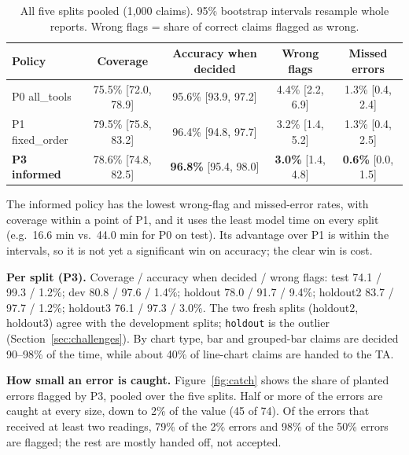 \documentclass[11pt,a4paper]{article}
\newcommand{\code}[1]{\texttt{\small #1}}
\begin{document}
\begin{table}[H]
\centering\small
\caption{All five splits pooled (1{,}000 claims). 95\% bootstrap intervals resample whole reports. Wrong flags = share of correct claims flagged as wrong.}
\label{tab:main}
\begin{tabular}{lcccc}
\toprule
Policy & Coverage & Accuracy when decided & Wrong flags & Missed errors \\
\midrule
P0 all\_tools & 75.5\% [72.0, 78.9] & 95.6\% [93.9, 97.2] & 4.4\% [2.2, 6.9] & 1.3\% [0.4, 2.4] \\
P1 fixed\_order & 79.5\% [75.8, 83.2] & 96.4\% [94.8, 97.7] & 3.2\% [1.4, 5.2] & 1.3\% [0.4, 2.5] \\
\textbf{P3 informed} & 78.6\% [74.8, 82.5] & \textbf{96.8\%} [95.4, 98.0] & \textbf{3.0\%} [1.4, 4.8] & \textbf{0.6\%} [0.0, 1.5] \\
\bottomrule
\end{tabular}
\end{table}

The informed policy has the lowest wrong-flag and missed-error rates, with coverage within a point of P1, and it uses the least model time on every split (e.g.\ 16.6 min vs.\ 44.0 min for P0 on test). Its advantage over P1 is within the intervals, so it is not yet a significant win on accuracy; the clear win is cost.

\textbf{Per split (P3).} Coverage / accuracy when decided / wrong flags: test 74.1 / 99.3 / 1.2\%; dev 80.8 / 97.6 / 1.4\%; holdout 78.0 / 91.7 / 9.4\%; holdout2 83.7 / 97.7 / 1.2\%; holdout3 76.1 / 97.3 / 3.0\%. The two fresh splits (holdout2, holdout3) agree with the development splits; \code{holdout} is the outlier (Section~\ref{sec:challenges}). By chart type, bar and grouped-bar claims are decided 90--98\% of the time, while about 40\% of line-chart claims are handed to the TA.

\textbf{How small an error is caught.} Figure~\ref{fig:catch} shows the share of planted errors flagged by P3, pooled over the five splits. Half or more of the errors are caught at every size, down to 2\% of the value (45 of 74). Of the errors that received at least two readings, 79\% of the 2\% errors and 98\% of the 50\% errors are flagged; the rest are mostly handed off, not accepted.
\end{document}
